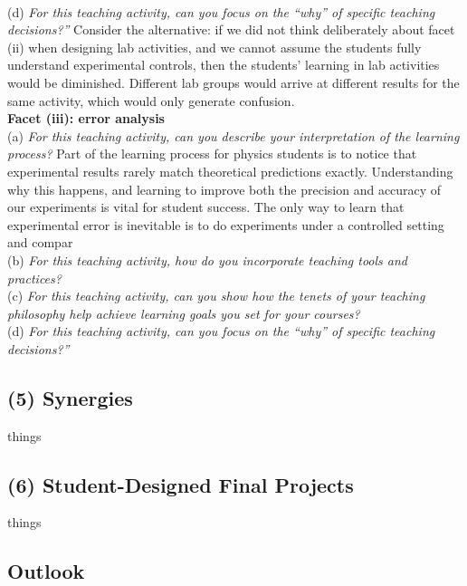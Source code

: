 \documentclass[../../../main.tex]{subfiles}
\begin{document}
\\
\vspace{0.25cm}
(d) \textit{For this teaching activity, can you focus on the ``why'' of specific teaching decisions?''}  Consider the alternative: if we did not think deliberately about facet (ii) when designing lab activities, and we cannot assume the students fully understand experimental controls, then the students' learning in lab activities would be diminished.  Different lab groups would arrive at different results for the same activity, which would only generate confusion.
\\
\vspace{0.25cm}
\textbf{Facet (iii): error analysis}
\\
\vspace{0.25cm}
(a) \textit{For this teaching activity, can you describe your interpretation of the learning process?}  Part of the learning process for physics students is to notice that experimental results rarely match theoretical predictions exactly.  Understanding why this happens, and learning to improve both the precision and accuracy of our experiments is vital for student success.  The only way to learn that experimental error is inevitable is to do experiments under a controlled setting and compar
\\
\vspace{0.25cm}
(b) \textit{For this teaching activity, how do you incorporate teaching tools and practices?}
\\
\vspace{0.25cm}
(c) \textit{For this teaching activity, can you show how the tenets of your teaching philosophy help achieve learning goals you
set for your courses?}
\\
\vspace{0.25cm}
(d) \textit{For this teaching activity, can you focus on the ``why'' of specific teaching decisions?''}
\subsection{(5) Synergies}
things
\subsection{(6) Student-Designed Final Projects}
things
\subsection{Outlook}

\end{document}
